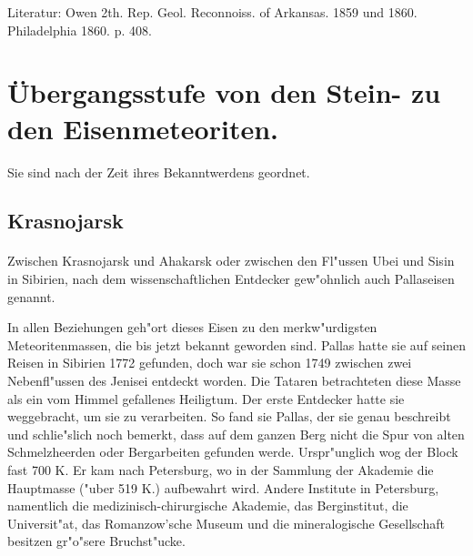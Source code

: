 \documentclass[a4paper, 11pt, oneside]{article}
\begin{document}
\footnotesize
Literatur: Owen 2th. Rep. Geol. Reconnoiss. of Arkansas. 1859 und 1860. Philadelphia 1860. p. 408.
\clearpage
\normalsize
\section{Übergangsstufe von den Stein- zu den Eisenmeteoriten.}

Sie sind nach der Zeit ihres Bekanntwerdens geordnet.

\subsection{Krasnojarsk}
\normalsize
\paragraph{}
Zwischen Krasnojarsk und Ahakarsk oder zwischen den Fl"ussen Ubei und Sisin in Sibirien, nach dem wissenschaftlichen Entdecker gew"ohnlich auch Pallaseisen genannt.

In allen Beziehungen geh"ort dieses Eisen zu den merkw"urdigsten Meteoritenmassen, die bis jetzt bekannt geworden sind. Pallas hatte sie auf seinen Reisen in Sibirien 1772 gefunden, doch war sie schon 1749 zwischen zwei Nebenfl"ussen des Jenisei entdeckt worden. Die Tataren betrachteten diese Masse als ein vom Himmel gefallenes Heiligtum. Der erste Entdecker hatte sie weggebracht, um sie zu verarbeiten. So fand sie Pallas, der sie genau beschreibt und schlie"slich noch bemerkt, dass auf dem ganzen Berg nicht die Spur von alten Schmelzheerden oder Bergarbeiten gefunden werde. Urspr"unglich wog der Block fast 700 K. Er kam nach Petersburg, wo in der Sammlung der Akademie die Hauptmasse ("uber 519 K.) aufbewahrt wird. Andere Institute in Petersburg, namentlich die medizinisch-chirurgische Akademie, das Berginstitut, die Universit"at, das Romanzow'sche Museum und die mineralogische Gesellschaft besitzen gr"o"sere Bruchst"ucke.
\end{document}
